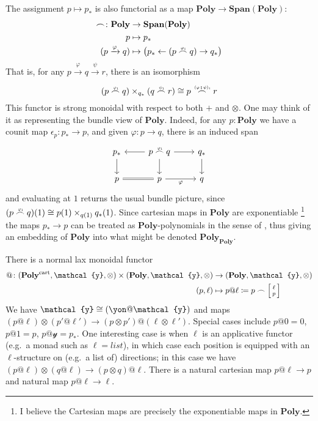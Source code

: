 \documentclass[11pt, one side, article]{memoir}
\makeatletter
\theoremstyle{definition}
\theoremstyle{plain}
\newcommand{\Cat}[1]{\mathbf{#1}}%
\newcommand{\Fun}[1]{\mathit{#1}}%
\newcommand{\then}{\mathbin{\fatsemi}}
\newcommand{\To}[2][]{\xrightarrow[#1]{#2}}
\newcommand{\from}{\leftarrow}
\newcommand{\tn}[1]{\textnormal{#1}}
\newcommand{\List}{\Fun{list}}
\newcommand{\yon}{\mathcal{y}}
\newcommand{\poly}{\Cat{Poly}}
\newcommand{\Span}{\Cat{Span}}
\newcommand{\polycart}{\poly^{\tn{cart}}}
\newcommand{\0}{\textsf{0}}
\newcommand{\1}{\tn{\textsf{1}}}
\newcommand{\biglens}[2]{
     \begin{bmatrix}{\vphantom{f_f^f}#2} \\ {\vphantom{f_f^f}#1} \end{bmatrix}
}
\newcommand{\littlelens}[2]{
     \begin{bsmallmatrix}{\vphantom{f}#2} \\ {\vphantom{f}#1} \end{bsmallmatrix}
}
\newcommand{\lens}[2]{
  \relax\if@display
     \biglens{#1}{#2}
  \else
     \littlelens{#1}{#2}
  \fi
}
\newcommand{\indexcoclscale}[1]{\scalebox{.7}{#1}}
\newcommand{\cocl}[1]{
	\scriptsize\overset{\,\indexcoclscale{$#1$}}{\frown}\normalsize
}
\makeatother
\begin{document}
The assignment $p\mapsto p_*$ is also functorial as a map $\poly\to\Span(\poly)$:
\begin{align}
	\cocl{}\colon\poly&\to\Span(\poly)\\
	p&\mapsto p_*\\
	(p\To{\varphi}q)&\mapsto\big( p_*\from(p\cocl{\varphi_1}q)\to q_*\big)
\end{align}\goodbreak
That is, for any $p\To{\varphi}q\To{\psi}r$, there is an isomorphism
\begin{equation}
	(p\cocl{\varphi_1}q)\times_{ q_*}(q\cocl{\psi_1}r)\cong p\cocl{(\varphi\then\psi)_1}r
\end{equation}
This functor is strong monoidal with respect to both $+$ and $\otimes$. One may think of it as representing the bundle view of $\poly$. Indeed, for any $p:\poly$ we have a counit map $\epsilon_p\colon p_*\to p$, and given $\varphi\colon p\to q$, there is an induced span
\begin{equation}
\begin{tikzcd}
	 p_*\ar[d]&p\cocl{\varphi_1}q\ar[d]\ar[l]\ar[r]& q_*\ar[d]\\
	p\ar[r, equal]&p\ar[r,"\varphi"']&q
\end{tikzcd}
\end{equation}
and evaluating at $1$ returns the usual bundle picture, since $(p\cocl{\varphi_1}q)(1)\cong p(1)\times_{q(1)}q_*(1)$. Since cartesian maps in $\poly$ are exponentiable%
\footnote{I believe the Cartesian maps are precisely the exponentiable maps in $\poly$.}
the maps $p_*\to p$ can be treated as $\poly$-polynomials in the sense of \cite{weber2015polynomials}, thus giving an embedding of $\poly$ into what might be denoted $\poly_\poly$.

There is a normal lax monoidal functor 
\begin{align}
	@\colon(\polycart,\yon,\otimes)\times(\poly,\yon,\otimes)&\to(\poly,\yon,\otimes)\\
	(p,\ell)&\mapsto p@\ell\coloneqq p\frown\lens{p}{\ell}
\end{align}
We have $\yon\cong(\yon@\yon)$ and maps $(p@\ell)\otimes(p'@\ell')\to(p\otimes p')@(\ell\otimes\ell')$. Special cases include $p@0=0$, $p@1=p$, $p@\yon=p_*$. One interesting case is when $\ell$ is an applicative functor (e.g.\ a monad such as $\ell=\List$), in which case each position is equipped with an $\ell$-structure on (e.g.\ a list of) directions; in this case we have $(p@\ell)\otimes(q@\ell)\to (p\otimes q)@\ell$. There is a natural cartesian map $p@\ell\to p$ and natural map $p@\ell\to\ell$.
\end{document}
